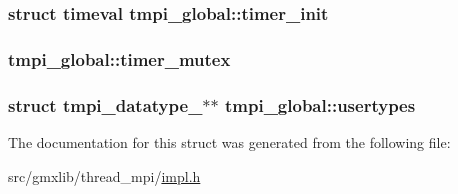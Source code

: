 \hypertarget{structtmpi__global_aee4e65ed581d88344707e4501951ec25}{
\subsubsection[{timer\-\_\-init}]{\setlength{\rightskip}{0pt plus 5cm}struct timeval {\bf tmpi\-\_\-global\-::timer\-\_\-init}}}\label{structtmpi__global_aee4e65ed581d88344707e4501951ec25}
\hypertarget{structtmpi__global_aef9b073f8c227fb05272516bf91ab694}{
\subsubsection[{timer\-\_\-mutex}]{ {\bf tmpi\-\_\-global\-::timer\-\_\-mutex}}}\label{structtmpi__global_aef9b073f8c227fb05272516bf91ab694}
\hypertarget{structtmpi__global_a282a8fd29f9e145538c93a221bb59b21}{
\subsubsection[{usertypes}]{\setlength{\rightskip}{0pt plus 5cm}struct {\bf tmpi\-\_\-datatype\-\_\-}$\ast$$\ast$ {\bf tmpi\-\_\-global\-::usertypes}}}\label{structtmpi__global_a282a8fd29f9e145538c93a221bb59b21}


\-The documentation for this struct was generated from the following file\-:\begin{DoxyCompactItemize}
\item 
src/gmxlib/thread\-\_\-mpi/\hyperlink{impl_8h}{impl.\-h}\end{DoxyCompactItemize}
